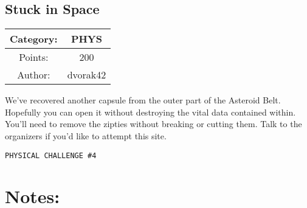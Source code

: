 \begin{center}
\section*{Stuck in Space}
{\large
\begin{tabular}{| c c |}
\hline
Category: & PHYS\\\hline
Points: & 200\\\hline
Author: & dvorak42\\\hline
\end{tabular}
}
\end{center}
\vspace{0.5in}

{\large
We've recovered another capsule from the outer part of the Asteroid Belt. Hopefully you can open it without destroying the vital data contained within. You'll need to remove the zipties without breaking or cutting them. Talk to the organizers if you'd like to attempt this site.
}
\vspace{0.25in}
\begin{center}
  {\Large\tt PHYSICAL CHALLENGE \#4}
\end{center}

\vspace{0.25in}
\section*{Notes:}
